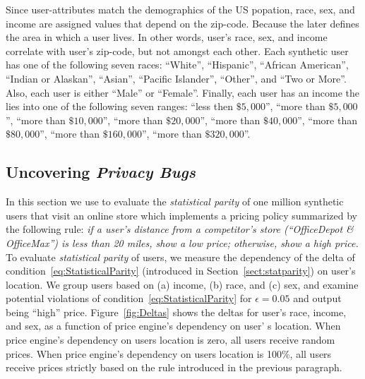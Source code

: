 Since user-attributes match the demographics of the US popation,
race, sex, and income are assigned values that depend on the zip-code. Because
the later defines the area in which a user lives. In other words, user's race,
sex, and income correlate with user's zip-code, but not amongst each other.
Each synthetic user has
one of the following seven races: ``White'', ``Hispanic'', ``African
American'', ``Indian or Alaskan'', ``Asian'', ``Pacific Islander'', ``Other'',
and ``Two or More''. Also, each user is either ``Male'' or ``Female''. Finally,
each user has an income the lies into one of the following seven ranges:
``less then $\$5,000$'', ``more than $\$5,000$'', ``more than $\$10,000$'',
``more than $\$20,000$'', ``more than $\$40,000$'', ``more than $\$80,000$'',
``more than $\$160,000$'', ``more than $\$320,000$''.

\subsection{\normalsize Uncovering {\em Privacy Bugs}}
\label{sect:uncovering}
In this section we use \sysname to evaluate the {\em statistical parity}
of one million synthetic users that visit an online store which
implements a pricing policy summarized by the following rule:
{\it if a user's distance from a competitor's store
(``OfficeDepot \& OfficeMax'') is less than 20 miles, show a low price;
otherwise, show a high price.}
To evaluate {\em statistical parity} of users, we measure the dependency of
the delta of condition~\ref{eq:StatisticalParity} (introduced
in Section~\ref{sect:statparity}) on user's location. We group users
based on (a) income, (b) race, and (c) sex, and examine potential
violations of condition~\ref{eq:StatisticalParity} for $\epsilon=0.05$ and
output being ``high'' price.
Figure~\ref{fig:Deltas} shows the deltas
for user's race, income, and sex, as a function of price engine's dependency
on user' s location. When price engine's dependency on users location is zero,
all users receive random prices. When price engine's dependency on users
location is 100\%, all users receive prices strictly based on the rule
introduced in the previous paragraph.


